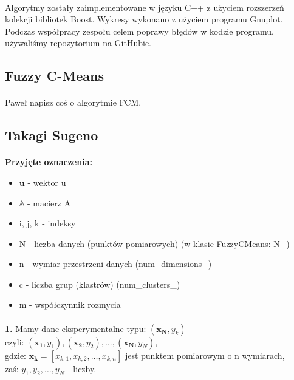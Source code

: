 \documentclass[10pt,a4paper]{article}
\begin{document}
\paragraph{}
Algorytmy zostały zaimplementowane w języku C++ z użyciem rozszerzeń kolekcji bibliotek Boost. Wykresy wykonano z użyciem programu Gnuplot. Podczas współpracy zespołu celem poprawy błędów w kodzie programu, używaliśmy repozytorium na GitHubie.

\subsection{Fuzzy C-Means}
\paragraph{}
Paweł napisz coś o algorytmie FCM.

\subsection{Takagi Sugeno}
\paragraph{}
\textbf{Przyjęte oznaczenia:}\\
\begin{itemize}
\item $ \bm{u}$  - wektor u
\item $\mathbb{A}$ - macierz A
\item i, j, k - indeksy
\item N - liczba danych (punktów pomiarowych) (w klasie FuzzyCMeans: N\_)
\item n - wymiar przestrzeni danych (num\_dimensions\_) 
\item c - liczba grup (klastrów) (num\_clusters\_)
\item m - współczynnik rozmycia
\end{itemize}

\paragraph{}
\textbf{1.} Mamy dane eksperymentalne typu: $(\bm{x_N}, y_k )$\\
czyli: $(\bm{x_1}, y_1), (\bm{x_2}, y_2), ..., (\bm{x_N}, y_N)$,\\
gdzie: $\bm{x_k} = [x_{k,1}, x_{k,2}, \ldots, x_{k, n}]$ jest punktem pomiarowym o n wymiarach,\\
zaś: $y_1, y_2, \ldots, y_N$ - liczby.
\end{document}
